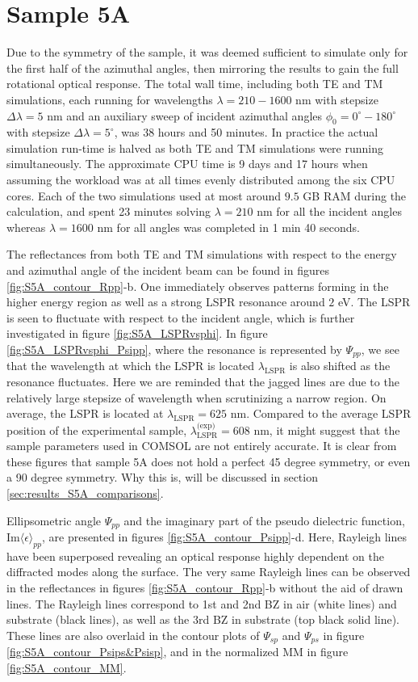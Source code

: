\section{Sample 5A}
Due to the symmetry of the sample, it was deemed sufficient to simulate only for the first half of the azimuthal angles, then mirroring the results to gain the full rotational optical response. The total wall time, including both TE and TM simulations, each running for wavelengths $\lambda=210-1600$ nm with stepsize $\Delta\lambda=5$ nm and an auxiliary sweep of incident azimuthal angles $\phi_0=0^\circ-180^\circ$ with stepsize $\Delta\lambda=5^\circ$, was 38 hours and 50 minutes. In practice the actual simulation run-time is halved as both TE and TM simulations were running simultaneously. The approximate CPU time is 9 days and 17 hours when assuming the workload was at all times evenly distributed among the six CPU cores. Each of the two simulations used at most around $9.5$ GB RAM during the calculation, and spent 23 minutes solving $\lambda=210$ nm for all the incident angles whereas $\lambda=1600$ nm for all angles was completed in 1 min 40 seconds.

The reflectances from both TE and TM simulations with respect to the energy and azimuthal angle of the incident beam can be found in figures \ref{fig:S5A_contour_Rpp}-b. One immediately observes patterns forming in the higher energy region as well as a strong LSPR resonance around $2$ eV. The LSPR is seen to fluctuate with respect to the incident angle, which is further investigated in figure \ref{fig:S5A_LSPRvsphi}. In figure \ref{fig:S5A_LSPRvsphi_Psipp}, where the resonance is represented by $\Psi_{pp}$, we see that the wavelength at which the LSPR is located $\lambda_{\text{LSPR}}$ is also shifted as the resonance fluctuates. Here we are reminded that the jagged lines are due to the relatively large stepsize of wavelength when scrutinizing a narrow region. On average, the LSPR is located at $\lambda_{\text{LSPR}}=625$ nm. Compared to the average LSPR position of the experimental sample, $\lambda_{\text{LSPR}}^\text{(exp)}=608$ nm, it might suggest that the sample parameters used in COMSOL are not entirely accurate. It is clear from these figures that sample 5A does not hold a perfect 45 degree symmetry, or even a 90 degree symmetry. Why this is, will be discussed in section \ref{sec:results_S5A_comparisons}.

Ellipsometric angle $\Psi_{pp}$ and the imaginary part of the pseudo dielectric function, $\text{Im}\langle\epsilon\rangle_{pp}$, are presented in figures \ref{fig:S5A_contour_Psipp}-d. Here, Rayleigh lines have been superposed revealing an optical response highly dependent on the diffracted modes along the surface. The very same Rayleigh lines can be observed in the reflectances in figures \ref{fig:S5A_contour_Rpp}-b without the aid of drawn lines. The Rayleigh lines correspond to 1st and 2nd BZ in air (white lines) and substrate (black lines), as well as the 3rd BZ in substrate (top black solid line). These lines are also overlaid in the contour plots of $\Psi_{sp}$ and $\Psi_{ps}$ in figure \ref{fig:S5A_contour_Psips&Psisp}, and in the normalized MM in figure \ref{fig:S5A_contour_MM}. 

